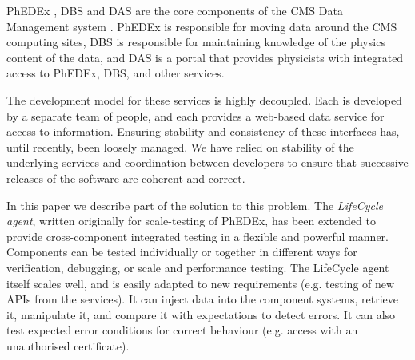 PhEDEx \cite{PhEDEx}, DBS \cite{DBS} and DAS \cite{DAS} are the core components of the CMS Data 
Management system \cite{CMSDMS}. PhEDEx is responsible for moving data around the CMS computing 
sites, DBS is responsible for maintaining knowledge of the physics content of the data, and DAS is 
a portal that provides physicists with integrated access to PhEDEx, DBS, and other services.

The development model for these services is highly decoupled. Each is developed by a separate team 
of people, and each provides a web-based data service for access to information. Ensuring 
stability and consistency of these interfaces has, until recently, been loosely managed. We have 
relied on stability of the underlying services and coordination between developers to ensure that 
successive releases of the software are coherent and correct.

In this paper we describe part of the solution to this problem. The {\it LifeCycle agent}, written 
originally for scale-testing of PhEDEx, has been extended to provide cross-component integrated 
testing in a flexible and powerful manner. Components can be tested individually or together in 
different ways for verification, debugging, or scale and performance testing. The LifeCycle agent 
itself scales well, and is easily adapted to new requirements (e.g. testing of new APIs from the 
services). It can inject data into the component systems, retrieve it, manipulate it, and compare 
it with expectations to detect errors. It can also test expected error conditions for correct 
behaviour (e.g. access with an unauthorised certificate).
